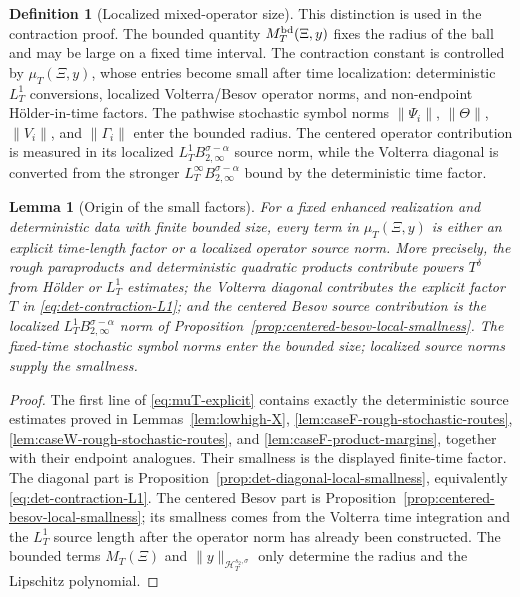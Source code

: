 \documentclass[10pt]{amsart}
\numberwithin{equation}{section}
\theoremstyle{plain}
\newtheorem{lemma}[theorem]{Lemma}
\theoremstyle{definition}
\newtheorem{definition}[theorem]{Definition}
\theoremstyle{remark}
\begin{document}
\begin{definition}[Localized mixed-operator size]
This distinction is used in the contraction proof.  The bounded quantity $M_T^{\rm bd}(\Xi,y)$ fixes the radius of the ball and may be large on a fixed time interval.  The contraction constant is controlled by $\mu_T(\Xi,y)$, whose entries become small after time localization: deterministic $L_T^1$ conversions, localized Volterra/Besov operator norms, and non-endpoint H\"older-in-time factors.  The pathwise stochastic symbol norms $\|\Psi_i\|$, $\|\Theta\|$, $\|V_i\|$, and $\|\Gamma_i\|$ enter the bounded radius.  The centered operator contribution is measured in its localized $L_T^1B_{2,\infty}^{\sigma-\alpha}$ source norm, while the Volterra diagonal is converted from the stronger $L_T^\infty B_{2,\infty}^{\sigma-\alpha}$ bound by the deterministic time factor.
\end{definition}

\begin{lemma}[Origin of the small factors]\label{lem:origin-small-factors}
For a fixed enhanced realization and deterministic data with finite bounded size, every term in $\mu_T(\Xi,y)$ is either an explicit time-length factor or a localized operator source norm.  More precisely, the rough paraproducts and deterministic quadratic products contribute powers $T^\delta$ from H\"older or $L_T^1$ estimates; the Volterra diagonal contributes the explicit factor $T$ in \eqref{eq:det-contraction-L1}; and the centered Besov source contribution is the localized $L_T^1B_{2,\infty}^{\sigma-\alpha}$ norm of Proposition~\ref{prop:centered-besov-local-smallness}.  The fixed-time stochastic symbol norms enter the bounded size; localized source norms supply the smallness.
\end{lemma}

\begin{proof}
The first line of \eqref{eq:muT-explicit} contains exactly the deterministic source estimates proved in Lemmas~\ref{lem:lowhigh-X}, \ref{lem:caseF-rough-stochastic-routes}, \ref{lem:caseW-rough-stochastic-routes}, and \ref{lem:caseF-product-margins}, together with their endpoint analogues.  Their smallness is the displayed finite-time factor.  The diagonal part is Proposition~\ref{prop:det-diagonal-local-smallness}, equivalently \eqref{eq:det-contraction-L1}.  The centered Besov part is Proposition~\ref{prop:centered-besov-local-smallness}; its smallness comes from the Volterra time integration and the $L_T^1$ source length after the operator norm has already been constructed.  The bounded terms $M_T(\Xi)$ and $\|y\|_{\mathcal H_T^{s_2,\sigma}}$ only determine the radius and the Lipschitz polynomial.
\end{proof}
\end{document}
